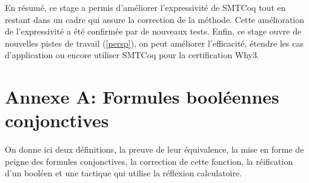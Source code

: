 \documentclass[11pt]{article}
\begin{document}
En résumé, ce stage a permis d'améliorer l'expressivité de SMTCoq tout en restant dans un cadre qui assure la correction de la méthode. Cette amélioration de l'expressivité a été confirmée par de nouveaux tests. Enfin, ce stage ouvre de nouvelles pistes de travail (\ref{persp}), on peut améliorer l'efficacité, étendre les cas d'application ou encore utiliser SMTCoq pour la certification Why3.



\newpage
\pagestyle{empty}
\renewcommand\refname{Bibliographie}
\nocite{*}
{}




\section*{Annexe A: Formules booléennes conjonctives}

On donne ici deux définitions, la preuve de leur équivalence, la mise en forme de peigne des formules conjonctives, la correction de cette fonction, la réification d'un booléen et une tactique qui utilise la réflexion calculatoire.
\end{document}
